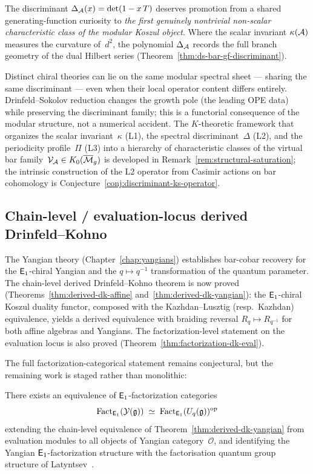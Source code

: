 The discriminant $\Delta_{\mathcal{A}}(x) = \det(1 - x\,T)$ deserves
promotion from a shared generating-function curiosity to
\emph{the first genuinely nontrivial non-scalar characteristic class
of the modular Koszul object}.  Where the scalar invariant
$\kappa(\mathcal{A})$ measures the curvature of~$d^2$, the polynomial
$\Delta_{\mathcal{A}}$ records the full branch geometry of the dual
Hilbert series (Theorem~\ref{thm:ds-bar-gf-discriminant}).

Distinct chiral theories can lie on the same modular spectral
sheet --- sharing the same discriminant --- even when their local
operator content differs entirely.  Drinfeld--Sokolov reduction
changes the growth pole (the leading OPE data) while preserving
the discriminant family; this is a functorial consequence of the
modular structure, not a numerical accident.
The $K$-theoretic framework that organizes the scalar
invariant~$\kappa$ (L1), the spectral discriminant~$\Delta$ (L2),
and the periodicity profile~$\Pi$ (L3) into a hierarchy of
characteristic classes of the virtual bar
family~$\mathcal{V}_{\mathcal{A}} \in K_0(\overline{\mathcal{M}}_g)$
is developed in Remark~\ref{rem:structural-saturation}; the
intrinsic construction of the L2 operator from Casimir actions
on bar cohomology is Conjecture~\ref{conj:discriminant-ks-operator}.

\subsection{Chain-level / evaluation-locus derived Drinfeld--Kohno}

The Yangian theory (Chapter~\ref{chap:yangians}) establishes bar-cobar
recovery for the $\mathsf{E}_1$-chiral Yangian and the $q \mapsto q^{-1}$
transformation of the quantum parameter.  The chain-level derived
Drinfeld--Kohno theorem is now proved
(Theorems~\ref{thm:derived-dk-affine}
and~\ref{thm:derived-dk-yangian}): the $\mathsf{E}_1$-chiral Koszul duality
functor, composed with the Kazhdan--Lusztig (resp.\ Kazhdan)
equivalence, yields a derived equivalence with braiding reversal
$R_q \mapsto R_{q^{-1}}$ for both affine algebras and Yangians.
The factorization-level statement on the evaluation locus is also
proved (Theorem~\ref{thm:factorization-dk-eval}).

The full factorization-categorical statement remains conjectural, but
the remaining work is staged rather than monolithic:

\begin{conjecture}
\label{conj:derived-drinfeld-kohno}
There exists an equivalence of $\mathsf{E}_1$-factorization categories
\[
\operatorname{Fact}_{\mathsf{E}_1}(\mathcal{Y}(\mathfrak{g}))
\;\simeq\;
\operatorname{Fact}_{\mathsf{E}_1}(U_q(\mathfrak{g}))^{\mathrm{op}}
\]
extending the chain-level equivalence of
Theorem~\textup{\ref{thm:derived-dk-yangian}}
from evaluation modules to all objects of Yangian
category~$\mathcal{O}$, and identifying the Yangian
$\mathsf{E}_1$-factorization structure with the factorisation quantum
group structure of Latyntsev~\cite{Latyntsev23}.
\end{conjecture}

